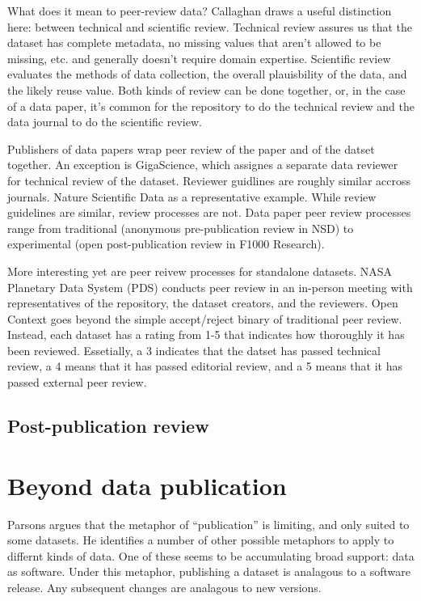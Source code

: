 \documentclass[10pt,a4paper,twocolumn]{article}
\begin{document}
What does it mean to peer-review data?
Callaghan draws a useful distinction here: between technical and scientific review. \cite{callaghan_making_2012}
Technical review assures us that the dataset has complete metadata, no missing values that aren't allowed to be missing, etc. and generally doesn't require domain expertise. 
Scientific review evaluates the methods of data collection, the overall plauisbility of the data, and the likely reuse value. 
Both kinds of review can be done together, or, in the case of a data paper, it's common for the repository to do the technical review and the data journal to do the scientific review.

Publishers of data papers wrap peer review of the paper and of the datset together. 
An exception is GigaScience\cite{gigascience}, which assignes a separate data reviewer for technical review of the dataset. 
Reviewer guidlines are roughly similar accross journals. Nature Scientific Data as a representative example.
While review guidelines are similar, review processes are not. 
Data paper peer review processes range from traditional (anonymous pre-publication review in NSD) to experimental (open post-publication review in F1000 Research).

More interesting yet are peer reivew processes for standalone datasets. 
NASA Planetary Data System (PDS)\cite{nasa_pds} conducts peer review in an in-person meeting with representatives of the repository, the dataset creators, and the reviewers. 
Open Context goes beyond the simple accept/reject binary of traditional peer review. 
Instead, each dataset has a rating from 1-5 that indicates how thoroughly it has been reviewed. 
Essetially, a 3 indicates that the datset has passed technical review, a 4 means that it has passed editorial review, and a 5 means that it has passed external peer review.

\subsection*{Post-publication review}\label{post-publication-review}

\section*{Beyond data publication}\label{beyond-data-publication}

Parsons\cite{parsons_is_2013} argues that the metaphor of ``publication'' is limiting, and only suited to some datasets. 
He identifies a number of other possible metaphors to apply to differnt kinds of data.
One of these seems to be accumulating broad support: data as software. 
Under this metaphor, publishing a dataset is analagous to a software release. 
Any subsequent changes are analagous to new versions.
\end{document}
